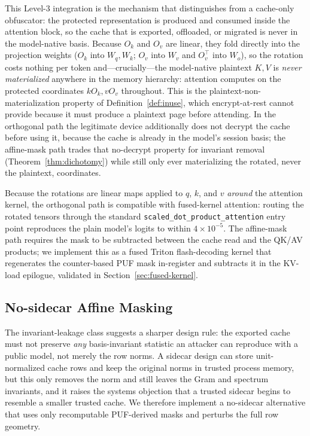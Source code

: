 This Level-3 integration is the mechanism that distinguishes \sys{} from a cache-only obfuscator: the protected representation is produced and consumed inside the attention block, so the cache that is exported, offloaded, or migrated is never in the model-native basis. Because $O_k$ and $O_v$ are linear, they fold directly into the projection weights ($O_k$ into $W_q,W_k$; $O_v$ into $W_v$ and $O_v^\top$ into $W_o$), so the rotation costs nothing per token and---crucially---the model-native plaintext $K,V$ is \emph{never materialized} anywhere in the memory hierarchy: attention computes on the protected coordinates $kO_k,vO_v$ throughout. This is the plaintext-non-materialization property of Definition~\ref{def:inuse}, which encrypt-at-rest cannot provide because it must produce a plaintext page before attending. In the orthogonal path the legitimate device additionally does not decrypt the cache before using it, because the cache is already in the model's session basis; the affine-mask path trades that no-decrypt property for invariant removal (Theorem~\ref{thm:dichotomy}) while still only ever materializing the rotated, never the plaintext, coordinates.

Because the rotations are linear maps applied to $q$, $k$, and $v$ \emph{around} the attention kernel, the orthogonal path is compatible with fused-kernel attention: routing the rotated tensors through the standard \texttt{scaled\_dot\_product\_attention} entry point reproduces the plain model's logits to within $4\times10^{-5}$. The affine-mask path requires the mask to be subtracted between the cache read and the QK/AV products; we implement this as a fused Triton flash-decoding kernel that regenerates the counter-based PUF mask in-register and subtracts it in the KV-load epilogue, validated in Section~\ref{sec:fused-kernel}.

\subsection{No-sidecar Affine Masking}

The invariant-leakage class suggests a sharper design rule: the exported cache must not preserve \emph{any} basis-invariant statistic an attacker can reproduce with a public model, not merely the row norms. A sidecar design can store unit-normalized cache rows and keep the original norms in trusted process memory, but this only removes the norm and still leaves the Gram and spectrum invariants, and it raises the systems objection that a trusted sidecar begins to resemble a smaller trusted cache. We therefore implement a no-sidecar alternative that uses only recomputable PUF-derived masks and perturbs the full row geometry.

